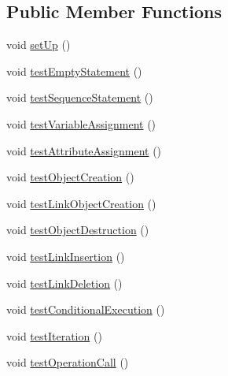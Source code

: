 \subsection*{Public Member Functions}
\begin{DoxyCompactItemize}
\item 
void \hyperlink{classorg_1_1tzi_1_1use_1_1parser_1_1soil_1_1_a_s_t_construction_test_ab31d5a21590882d8a7d20b0f417b2155}{set\-Up} ()
\item 
void \hyperlink{classorg_1_1tzi_1_1use_1_1parser_1_1soil_1_1_a_s_t_construction_test_a5e98825b59c1ff08bc567ef83312ab6d}{test\-Empty\-Statement} ()
\item 
void \hyperlink{classorg_1_1tzi_1_1use_1_1parser_1_1soil_1_1_a_s_t_construction_test_a0d561912f21b75b3fb7cd828dcb2ddba}{test\-Sequence\-Statement} ()
\item 
void \hyperlink{classorg_1_1tzi_1_1use_1_1parser_1_1soil_1_1_a_s_t_construction_test_a3abcc033657b5cf045804888dcbf829c}{test\-Variable\-Assignment} ()
\item 
void \hyperlink{classorg_1_1tzi_1_1use_1_1parser_1_1soil_1_1_a_s_t_construction_test_aa7d39914f5ed956cc8cb706e6e09f7f4}{test\-Attribute\-Assignment} ()
\item 
void \hyperlink{classorg_1_1tzi_1_1use_1_1parser_1_1soil_1_1_a_s_t_construction_test_af43430bdffd998dba098c94a6255a516}{test\-Object\-Creation} ()
\item 
void \hyperlink{classorg_1_1tzi_1_1use_1_1parser_1_1soil_1_1_a_s_t_construction_test_a37facb835afcef8c9c5e5b230aebd79b}{test\-Link\-Object\-Creation} ()
\item 
void \hyperlink{classorg_1_1tzi_1_1use_1_1parser_1_1soil_1_1_a_s_t_construction_test_a749593ab3a18c6f4ee8a1b490c09e9bd}{test\-Object\-Destruction} ()
\item 
void \hyperlink{classorg_1_1tzi_1_1use_1_1parser_1_1soil_1_1_a_s_t_construction_test_adcd945bc85142fcb5cd4715d5a164a6c}{test\-Link\-Insertion} ()
\item 
void \hyperlink{classorg_1_1tzi_1_1use_1_1parser_1_1soil_1_1_a_s_t_construction_test_ad9e00038ae54e4ae94ab02b77b084289}{test\-Link\-Deletion} ()
\item 
void \hyperlink{classorg_1_1tzi_1_1use_1_1parser_1_1soil_1_1_a_s_t_construction_test_aa547acb5aa1ab619f2539083ca3715aa}{test\-Conditional\-Execution} ()
\item 
void \hyperlink{classorg_1_1tzi_1_1use_1_1parser_1_1soil_1_1_a_s_t_construction_test_abe1c7c17785b4451327f6fb4acdd9d5d}{test\-Iteration} ()
\item 
void \hyperlink{classorg_1_1tzi_1_1use_1_1parser_1_1soil_1_1_a_s_t_construction_test_afefa3fe488f414d2c1fef45b7b0b95b8}{test\-Operation\-Call} ()
\end{DoxyCompactItemize}


